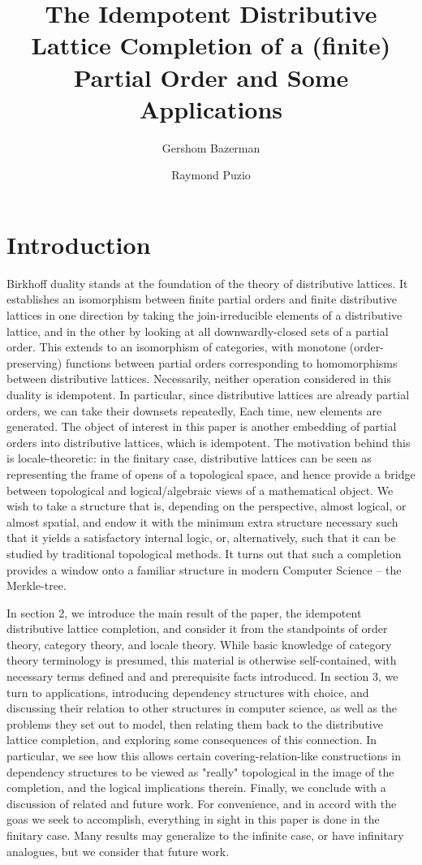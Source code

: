 \documentclass[hoptionsi,review,format=sigplan]{acmart}
\title[Idempotent Distributive Lattice Completion]{The Idempotent Distributive Lattice Completion of a (finite) Partial Order and Some Applications}
\author{Gershom Bazerman}
\affiliation{Awake Security}
\author{Raymond Puzio}
\affiliation{Albert Einstein Institute}
\theoremstyle{definition}
\begin{document}
\maketitle

\section{Introduction}

Birkhoff duality stands at the foundation of the theory of distributive lattices. It establishes an isomorphism between finite partial orders and finite distributive lattices in one direction by taking the join-irreducible elements of a distributive lattice, and in the other by looking at all downwardly-closed sets of a partial order. This extends to an isomorphism of categories, with monotone (order-preserving) functions between partial orders corresponding to homomorphisms between distributive lattices. Necessarily, neither operation considered in this duality is idempotent. In particular, since distributive lattices are already partial orders, we can take their downsets repeatedly, Each time, new elements are generated. The object of interest in this paper is another embedding of partial orders into distributive lattices, which is idempotent. The motivation behind this is locale-theoretic: in the finitary case, distributive lattices can be seen as representing the frame of opens of a topological space, and hence provide a bridge between topological and logical/algebraic views of a mathematical object. We wish to take a structure that is, depending on the perspective, almost logical, or almost spatial, and endow it with the minimum extra structure necessary such that it yields a satisfactory internal logic, or, alternatively, such that it can be studied by traditional topological methods. It turns out that such a completion provides a window onto a familiar structure in modern Computer Science -- the Merkle-tree.

In section 2, we introduce the main result of the paper, the idempotent distributive lattice completion, and consider it from the standpoints of order theory, category theory, and locale theory. While basic knowledge of category theory terminology is presumed, this material is otherwise self-contained, with necessary terms defined and and prerequisite facts introduced. In section 3, we turn to applications, introducing dependency structures with choice, and discussing their relation to other structures in computer science, as well as the problems they set out to model, then relating them back to the distributive lattice completion, and exploring some consequences of this connection. In particular, we see how this allows certain covering-relation-like constructions in dependency structures to be viewed as "really" topological in the image of the completion, and the logical implications therein. Finally, we conclude with a discussion of related and future work. For convenience, and in accord with the goas we seek to accomplish, everything in sight in this paper is done in the finitary case. Many results may generalize to the infinite case, or have infinitary analogues, but we consider that future work.
\end{document}
